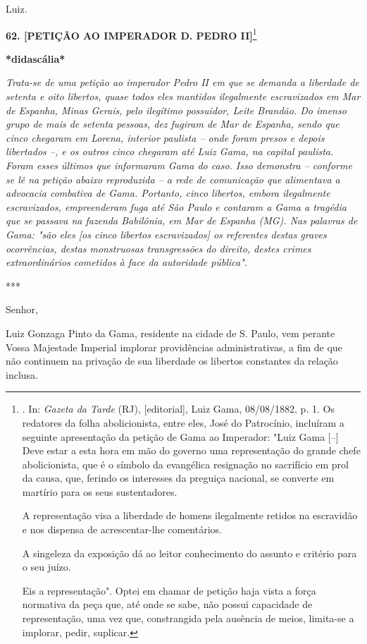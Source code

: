 Luiz.

\textbf{62. {[}PETIÇÃO AO IMPERADOR D. PEDRO II{]}}\footnote{. In:
  \emph{Gazeta da Tarde} (RJ), {[}editorial{]}, Luiz Gama, 08/08/1882,
  p. 1. Os redatores da folha abolicionista, entre eles, José do
  Patrocínio, incluíram a seguinte apresentação da petição de Gama ao
  Imperador: "Luiz Gama {[}--{]} Deve estar a esta hora em mão do
  governo uma representação do grande chefe abolicionista, que é o
  símbolo da evangélica resignação no sacrifício em prol da causa, que,
  ferindo os interesses da preguiça nacional, se converte em martírio
  para os seus sustentadores.

  A representação visa a liberdade de homens ilegalmente retidos na
  escravidão e nos dispensa de acrescentar-lhe comentários.

  A singeleza da exposição dá ao leitor conhecimento do assunto e
  critério para o seu juízo.

  Eis a representação". Optei em chamar de petição haja vista a força
  normativa da peça que, até onde se sabe, não possui capacidade de
  representação, uma vez que, constrangida pela ausência de meios,
  limita-se a implorar, pedir, suplicar.}

\textbf{*didascália*}

\emph{Trata-se de uma petição ao imperador Pedro II em que se demanda a
liberdade de setenta e oito libertos, quase todos eles mantidos
ilegalmente escravizados em Mar de Espanha, Minas Gerais, pelo ilegítimo
possuidor, Leite Brandão. Do imenso grupo de mais de setenta pessoas,
dez fugiram de Mar de Espanha, sendo que cinco chegaram em Lorena,
interior paulista -- onde foram presos e depois libertados --, e os
outros cinco chegaram até Luiz Gama, na capital paulista. Foram esses
últimos que informaram Gama do caso. Isso demonstra -- conforme se lê na
petição abaixo reproduzida -- a rede de comunicação que alimentava a
advocacia combativa de Gama. Portanto, cinco libertos, embora
ilegalmente escravizados, empreenderam fuga até São Paulo e contaram a
Gama a tragédia que se passava na fazenda Babilônia, em Mar de Espanha
(MG). Nas palavras de Gama: "são eles {[}os cinco libertos
escravizados{]} os referentes destas graves ocorrências, destas
monstruosas transgressões do direito, destes crimes extraordinários
cometidos à face da autoridade pública". }

***

Senhor,

Luiz Gonzaga Pinto da Gama, residente na cidade de S. Paulo, vem perante
Vossa Majestade Imperial implorar providências administrativas, a fim de
que não continuem na privação de sua liberdade os libertos constantes da
relação inclusa.

